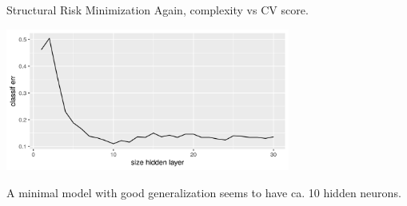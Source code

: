 \documentclass[11pt,compress,t,notes=noshow, xcolor=table]{beamer}
\begin{document}
\begin{frame} {Structural Risk Minimization}
Again, complexity vs CV score. 

\begin{center}\includegraphics[width=0.7\textwidth]{figure/fig-regu-nonlin-srm-2.png}\end{center}

A minimal model with good generalization seems to have ca. 10 hidden neurons.

\end{frame}
\end{document}
